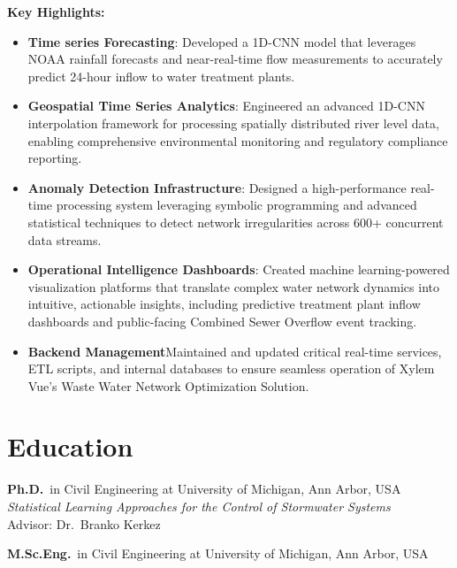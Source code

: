 \documentclass[a4paper,11pt]{article}
\newcommand{\years}[1]{%
  {\reversemarginpar\strut\marginnote{{\small#1}}}%
}
\begin{document}
\vspace{2mm}
{\small \textbf{Key Highlights:}}
\vspace{-2mm}
\begin{itemize}
	\setlength\itemsep{1mm}
	\item \textbf{Time series Forecasting}: Developed a 1D-CNN model that leverages NOAA rainfall forecasts and near-real-time flow measurements to accurately predict 24-hour inflow to water treatment plants.
	\item \textbf{Geospatial Time Series Analytics}: Engineered an advanced 1D-CNN interpolation framework for processing spatially distributed river level data, enabling comprehensive environmental monitoring and regulatory compliance reporting.
	\item \textbf{Anomaly Detection Infrastructure}: Designed a high-performance real-time processing system leveraging symbolic programming and advanced statistical techniques to detect network irregularities across 600+ concurrent data streams.
	\item \textbf{Operational Intelligence Dashboards}: Created machine learning-powered visualization platforms that translate complex water network dynamics into intuitive, actionable insights, including predictive treatment plant inflow dashboards and public-facing Combined Sewer Overflow event tracking.
	\item \textbf{Backend Management}Maintained and updated critical real-time services, ETL scripts, and internal databases to ensure seamless operation of Xylem Vue's Waste Water Network Optimization Solution.
\end{itemize}

\section*{Education}

\years{2017--2020}%
\textbf{Ph.D.}\ in Civil Engineering at University of Michigan, Ann Arbor, USA\\[.1cm]
\noindent \emph{Statistical Learning Approaches for the Control of Stormwater Systems}\\
Advisor: Dr.\ Branko Kerkez\\[.1cm]

\years{2015--2017}%
\textbf{M.Sc.Eng.}\ in Civil Engineering at University of Michigan, Ann Arbor, USA\\[.1cm]
\end{document}
